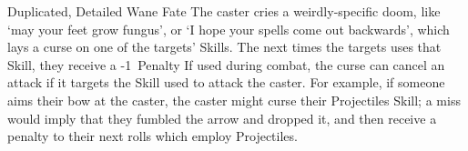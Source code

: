   {Duplicated, Detailed}%
  {Wane}%
  {Fate}%
  {}%
  {The caster cries a weirdly-specific doom, like `may your feet grow fungus', or `I hope your spells come out backwards', which lays a curse on one of the targets' Skills.
  The next  times the targets uses that Skill, they receive a -1~Penalty}%
  {If used during combat, the curse can cancel an attack if it targets the Skill used to attack the caster.
  For example, if someone aims their bow at the caster, the caster might curse their Projectiles Skill; a miss would imply that they fumbled the arrow and dropped it, and then receive a penalty to their next  rolls which employ Projectiles.}
